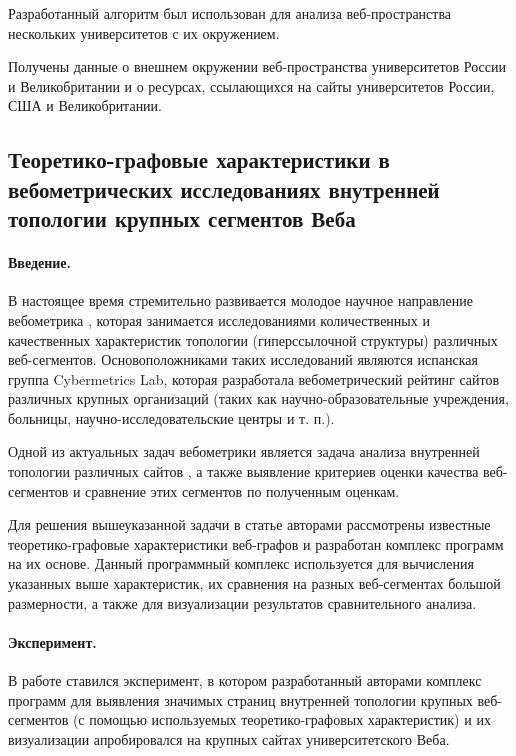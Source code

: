 Разработанный алгоритм был использован для анализа веб-пространства нескольких университетов с их окружением.

Получены данные о внешнем окружении веб-пространства университетов России и Великобритании и о ресурсах, ссылающихся на сайты университетов России, США и Великобритании.

\subsection{Теоретико-графовые характеристики в вебометрических исследованиях внутренней топологии крупных сегментов Веба}\label{subsec:ch1/sec4/sub8}

\paragraph{Введение.} В настоящее время стремительно развивается молодое научное направление вебометрика \cite{AlmindIngwersen,Thelwall,Pechnikov}, которая занимается исследованиями количественных и качественных характеристик топологии (гиперссылочной структуры) различных веб-сегментов. Основоположниками таких исследований являются испанская группа Cybermetrics Lab, которая разработала вебометрический рейтинг сайтов различных крупных организаций \cite{RankingWeb} (таких как научно-образовательные учреждения, больницы, научно-исследовательские центры и т. п.).  

Одной из актуальных задач вебометрики является задача анализа внутренней топологии различных сайтов \cite{Thelwall,BlekanovSergeevMaksimov,MaksimovBlekanov,BlekanovSergeevMaksimovBOWTIE}, а также выявление критериев оценки качества веб-сегментов и сравнение этих сегментов по полученным оценкам.  

Для решения вышеуказанной задачи в статье авторами рассмотрены известные теоретико-графовые характеристики веб-графов и разработан комплекс программ на их основе. Данный программный комплекс используется для вычисления указанных выше характеристик, их сравнения на разных веб-сегментах большой размерности, а также для визуализации результатов сравнительного анализа.  

\paragraph{Эксперимент.} В работе ставился эксперимент, в котором разработанный авторами комплекс программ для выявления значимых страниц внутренней топологии крупных веб-сегментов (с помощью используемых теоретико-графовых характеристик) и их визуализации апробировался на крупных сайтах университетского Веба. 

